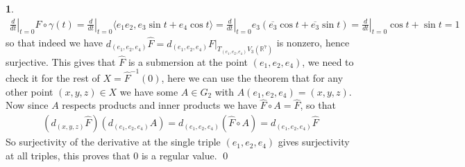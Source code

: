 \documentclass[10.5pt]{article}
\theoremstyle{definition}
\newtheorem{pb}{}
\newcommand{\gen}[1]{\langle#1\rangle}
\begin{document}
\begin{pb}
        \begin{align*}
            \left.\frac{d}{dt}\right\vert_{t=0}F\circ\gamma(t) = \left.\frac{d}{dt}\right\vert_{t=0} \gen{e_1e_2,e_3\sin t + e_4\cos t} = \left.\frac{d}{dt}\right\vert_{t=0}e_3(\overline{e_3}\cos t + \overline{e_3}\sin t) = \left.\frac{d}{dt}\right\vert_{t=0} \cos t + \sin t = 1
        \end{align*}
        so that indeed we have \(d_{(e_1,e_2,e_4)}\hat{F} = d_{(e_1,e_2,e_4)}F\vert_{T_{(e_1,e_2,e_4)}V_3(\mathbb{R}^7)}\) is nonzero, hence surjective. This gives that \(\hat{F}\) is a submersion at the point \((e_1,e_2,e_4)\), we need to check it for the rest of \(X = \hat{F}^{-1}(0)\), here we can use the theorem that for any other point \((x,y,z) \in X\) we have some \(A \in G_2\) with \(A(e_1,e_2,e_4) = (x,y,z)\). Now since \(A\) respects products and inner products we have \(\hat{F}\circ A = \hat{F}\), so that
        \begin{align*}
            (d_{(x,y,z)}\hat{F})(d_{(e_1,e_2,e_4)}A) = d_{(e_1,e_2,e_4)}(\hat{F}\circ A) = d_{(e_1,e_2,e_4)}\hat{F}
        \end{align*}
        So surjectivity of the derivative at the single triple \((e_1,e_2,e_4)\) gives surjectivity at all triples, this proves that \(0\) is a regular value. \qed


\end{pb}
\end{document}
